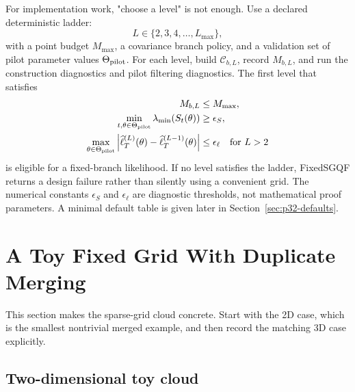 \documentclass[11pt]{article}
\numberwithin{equation}{section}
\newcommand{\ellhat}{\widehat\ell}
\begin{document}
For implementation work, "choose a level" is not enough.  Use a declared
deterministic ladder:
\begin{equation}
  L\in\{2,3,4,\ldots,L_{\max}\},
  \label{eq:p32-level-ladder}
\end{equation}
with a point budget \(M_{\max}\), a covariance branch policy, and a validation
set of pilot parameter values \(\Theta_{\rm pilot}\).  For each level, build
\(\mathcal C_{b,L}\), record \(M_{b,L}\), and run the construction diagnostics
and pilot filtering diagnostics.  The first level that satisfies
\begin{align}
  M_{b,L}&\le M_{\max},
  \label{eq:p32-ladder-budget}\\
  \min_{t,\theta\in\Theta_{\rm pilot}}\lambda_{\min}(S_t(\theta))
  &\ge \epsilon_S,
  \label{eq:p32-ladder-S}\\
  \max_{\theta\in\Theta_{\rm pilot}}
  \left|
  \ellhat_T^{(L)}(\theta)-\ellhat_T^{(L-1)}(\theta)
  \right|
  &\le \epsilon_\ell
  \quad\hbox{for }L>2
  \label{eq:p32-ladder-likelihood}
\end{align}
is eligible for a fixed-branch likelihood.  If no level satisfies the ladder,
FixedSGQF returns a design failure rather than silently using a convenient
grid.  The numerical constants \(\epsilon_S\) and \(\epsilon_\ell\) are
diagnostic thresholds, not mathematical proof parameters.  A minimal default
table is given later in Section~\ref{sec:p32-defaults}.

\section{A Toy Fixed Grid With Duplicate Merging}
\label{sec:p31-toy-grid}

This section makes the sparse-grid cloud concrete.  Start with the 2D case,
which is the smallest nontrivial merged example, and then record the matching 3D
case explicitly.

\subsection{Two-dimensional toy cloud}
\end{document}
